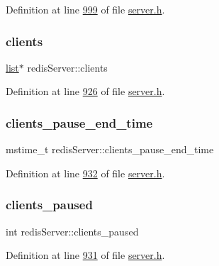 Definition at line \hyperlink{server_8h_source_l00999}{999} of file \hyperlink{server_8h_source}{server.\+h}.

\mbox{\label{structredisServer_a360ef3d1ba50e05f7dc9d133e2f2a07b}} 
\subsubsection{\texorpdfstring{clients}{clients}}
{\footnotesize\ttfamily \hyperlink{structlist}{list}$\ast$ redis\+Server\+::clients}



Definition at line \hyperlink{server_8h_source_l00926}{926} of file \hyperlink{server_8h_source}{server.\+h}.

\mbox{\label{structredisServer_abb5ef7c66d151088fbd9eb0f66a844f4}} 
\subsubsection{\texorpdfstring{clients\+\_\+pause\+\_\+end\+\_\+time}{clients\_pause\_end\_time}}
{\footnotesize\ttfamily mstime\+\_\+t redis\+Server\+::clients\+\_\+pause\+\_\+end\+\_\+time}



Definition at line \hyperlink{server_8h_source_l00932}{932} of file \hyperlink{server_8h_source}{server.\+h}.

\mbox{\label{structredisServer_a43984c9da576a321781701109e229cb7}} 
\subsubsection{\texorpdfstring{clients\+\_\+paused}{clients\_paused}}
{\footnotesize\ttfamily int redis\+Server\+::clients\+\_\+paused}



Definition at line \hyperlink{server_8h_source_l00931}{931} of file \hyperlink{server_8h_source}{server.\+h}.

